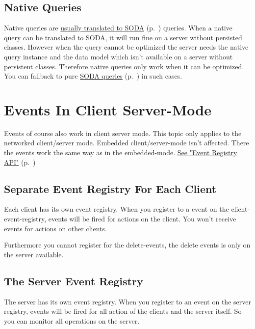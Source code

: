 \subsection*{Native Queries}

Native queries are \hyperref[ref:basics-querying-native-queries-native-query-optimization]{usually translated to SODA} (p.~\pageref{ref:basics-querying-native-queries-native-query-optimization}) queries. When a native query can be translated to SODA, it will run fine on a server without persisted classes. However when the query cannot be optimized the server needs the native query instance and the data model which isn't available on a server without persistent classes. Therefore native queries only work when it can be optimized. You can fallback to pure \hyperref[ref:basics-querying-soda-query]{SODA queries} (p.~\pageref{ref:basics-querying-soda-query}) in such cases.

\section{Events In Client Server-Mode}
\label{ref:client-server-events-in-cs-mode}

Events of course also work in client server mode. This topic only applies to the networked client/server mode. Embedded client/server-mode isn't affected. There the events work the same way as in the embedded-mode. \hyperref[ref:advanced-topics-callbacks-event-registry-api]{See "Event Registry API"} (p.~\pageref{ref:advanced-topics-callbacks-event-registry-api})

\subsection*{Separate Event Registry For Each Client}

Each client has its own event registry. When you register to a event on the client-event-registry, events will be fired for actions on the client. You won't receive events for actions on other clients.

Furthermore you cannot register for the delete-events, the delete events is only on the server available.

\subsection*{The Server Event Registry}

The server has its own event registry. When you register to an event on the server registry, events will be fired for all action of the clients and the server itself. So you can monitor all operations on the server.

